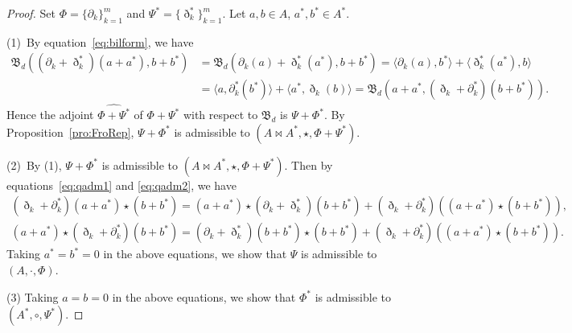 \documentclass[10pt,a4paper]{amsart}
\numberwithin{equation}{section}
\begin{document}
\begin{proof}
	Set $\Phi=\{\partial_k\}_{k=1}^m$ and $\Psi^* = \{\eth_k^*\}_{k=1}^m$.
 Let $a, b \in A$, $a^*, b^* \in A^*$.

 (1)~By equation~\eqref{eq:bilform}, we have
 \begin{align*}
 	\mathfrak{B}_d((\partial_k + \eth_k^*)(a + a^*), b + b^*) &= \mathfrak{B}_d(\partial_k(a) + \eth_k^*(a^*), b + b^*) = \langle \partial_k(a), b^* \rangle + \langle \eth_k^*(a^*), b \rangle \\
 	& = \langle a, \partial_k^*(b^*) \rangle + \langle a^*, \eth_k(b) \rangle
 	= \mathfrak{B}_d(a + a^*, (\eth_k + \partial_k^*)(b + b^*)).
 \end{align*}
 Hence the adjoint $\widehat{\Phi + \Psi^*}$ of $\Phi + \Psi^*$ with respect to $\mathfrak{B}_d$ is $\Psi + \Phi^*$.
 By Proposition~\ref{pro:FroRep},
 $\Psi + \Phi^*$ is admissible to $(A \bowtie A^*, \star, \Phi + \Psi^*)$.

 (2)~By (1), $\Psi + \Phi^*$ is admissible to $(A \bowtie A^*, \star, \Phi + \Psi^*)$.
 Then by equations~\eqref{eq:qadm1} and \eqref{eq:qadm2}, we have
 \begin{gather*}
 (\eth_k + \partial_k^*)(a + a^*) \star (b + b^*) = (a + a^*) \star (\partial_k + \eth_k^*)(b + b^*) + (\eth_k + \partial_k^*)((a + a^*)\star (b + b^*)), \\
 (a + a^*) \star (\eth_k + \partial_k^*)(b + b^*) =(\partial_k + \eth_k^*)(b + b^*) \star (b + b^*) + (\eth_k + \partial_k^*)((a + a^*) \star (b + b^*)).
 \end{gather*}
 Taking $a^* = b^* = 0$ in the above equations,
 we show that $\Psi$ is admissible to $(A, \cdot, \Phi)$.

 (3) Taking $a = b = 0$ in the above equations,
 we show that $\Phi^*$ is admissible to $(A^*, \circ, \Psi^*)$.
\end{proof}
\end{document}
